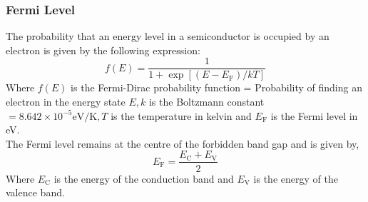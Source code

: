 \subsubsection{Fermi Level}
The probability that an energy level in a semiconductor is occupied by an electron is given by the following expression:
\begin{equation}
f(E)=\frac{1}{1+\exp \left[\left(E-E_{\mathrm{F}}\right) / k T\right]}
\end{equation}
Where $f(E)$ is the Fermi-Dirac probability function = Probability of finding an electron in the energy state $E, k$ is the Boltzmann constant $=8.642 \times 10^{-5} \mathrm{eV} / \mathrm{K}, T$ is the temperature in kelvin and $E_{\mathrm{F}}$ is the Fermi level in eV.\\
 The Fermi level remains at the centre of the forbidden band gap and is given by,
 \begin{equation}
E_{\mathrm{F}}=\frac{E_{\mathrm{C}}+E_{\mathrm{V}}}{2}
 \end{equation}
Where $E_{\mathrm{C}}$ is the energy of the conduction band and $E_{\mathrm{V}}$ is the energy of the valence band.
